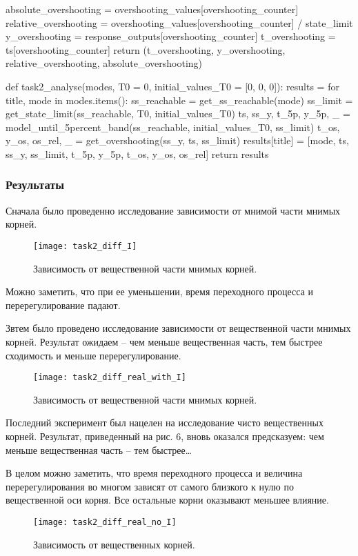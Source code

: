 \documentclass[16pt]{article}
\begin{document}
\begin{python}
    absolute_overshooting = overshooting_values[overshooting_counter]
    relative_overshooting = overshooting_values[overshooting_counter] / state_limit
    y_overshooting = response_outputs[overshooting_counter]
    t_overshooting = ts[overshooting_counter]
    return (t_overshooting, y_overshooting, relative_overshooting, absolute_overshooting)
    
    

def task2_analyse(modes, T0 = 0, initial_values_T0 = [0, 0, 0]):
    results = {}
    for title, mode in modes.items():
        ss_reachable = get_ss_reachable(mode)
        ss_limit = get_state_limit(ss_reachable, T0, initial_values_T0)
        ts, ss_y, t_5p, y_5p, _ = model_until_5percent_band(ss_reachable, initial_values_T0, ss_limit)
        t_os, y_os, os_rel, _ = get_overshooting(ss_y, ts, ss_limit)
        results[title] = [mode, ts, ss_y, ss_limit, t_5p, y_5p, t_os, y_os, os_rel]
    return results
\end{python}
\pagebreak
\subsubsection{Результаты}
Сначала было проведенно исследование зависимости от мнимой части мнимых корней.
\begin{figure}[h]
    \centering
    \texttt{[image: task2\_diff\_I]}
    \caption{Зависимость от вещественной части мнимых корней.}
    \label{fig:fig4}
\end{figure}
Можно заметить, что при ее уменьшении, время переходного процесса и перерегулирование падают.

Звтем было проведено исследование зависимости от вещественной части мнимых корней. Результат ожидаем -- чем меньше вещественная часть, тем быстрее сходимость и меньше перерегулирование.
\begin{figure}[h!]
    \centering
    \texttt{[image: task2\_diff\_real\_with\_I]}
    \caption{Зависимость от вещественной части мнимых корней.}
    \label{fig:fig5}
\end{figure}

Последний эксперимент был нацелен на исследование чисто вещественных корней. 
Результат, приведенный на рис. 6, вновь оказался предсказуем: чем меньше вещественная часть -- тем быстрее\dots

В целом можно заметить, что время переходного процесса и величина перерегулирования во многом зависят от самого близкого к нулю по вещественной оси корня. Все остальные корни оказывают меньшее влияние.
\begin{figure}[h]
    \centering
    \texttt{[image: task2\_diff\_real\_no\_I]}
    \caption{Зависимость от вещественных корней.}
    \label{fig:fig6}
\end{figure}
\end{document}
